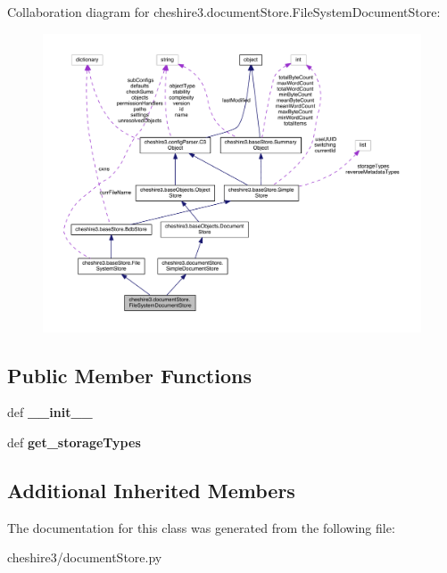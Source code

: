 Collaboration diagram for cheshire3.\-document\-Store.\-File\-System\-Document\-Store\-:
\nopagebreak
\begin{figure}[H]
\begin{center}
\leavevmode
\includegraphics[width=350pt]{classcheshire3_1_1document_store_1_1_file_system_document_store__coll__graph}
\end{center}
\end{figure}
\subsection*{Public Member Functions}
\begin{DoxyCompactItemize}
\item 
\hypertarget{classcheshire3_1_1document_store_1_1_file_system_document_store_a8552d1ed86b39a06988380b2f2cc11ef}{def {\bfseries \-\_\-\-\_\-init\-\_\-\-\_\-}}\label{classcheshire3_1_1document_store_1_1_file_system_document_store_a8552d1ed86b39a06988380b2f2cc11ef}

\item 
\hypertarget{classcheshire3_1_1document_store_1_1_file_system_document_store_a5392bbe926a3ca96ee45055181fedd8b}{def {\bfseries get\-\_\-storage\-Types}}\label{classcheshire3_1_1document_store_1_1_file_system_document_store_a5392bbe926a3ca96ee45055181fedd8b}

\end{DoxyCompactItemize}
\subsection*{Additional Inherited Members}


The documentation for this class was generated from the following file\-:\begin{DoxyCompactItemize}
\item 
cheshire3/document\-Store.\-py\end{DoxyCompactItemize}

